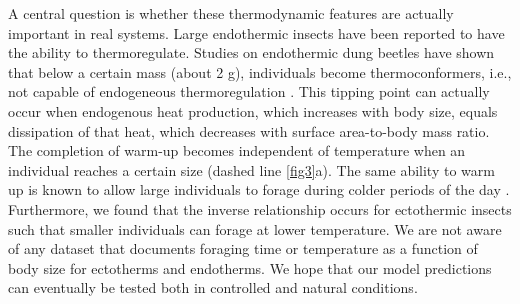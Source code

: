 A central question is whether these thermodynamic features are actually important in real systems.
Large endothermic insects have been reported to have the ability to thermoregulate.
Studies on endothermic dung beetles have shown that below a certain mass (about 2 g), individuals become thermoconformers, i.e., not capable of endogeneous thermoregulation \citep{Bartholomew1978, Verdu2006}.
This tipping point can actually occur when endogenous heat production, which increases with body size, equals dissipation of that heat, which decreases with surface area-to-body mass ratio.
The completion of warm-up becomes independent of temperature when an individual reaches a certain size (dashed line \cref{fig3}a).
The same ability to warm up is known to allow large individuals to forage during colder periods of the day \citep{May1985}.
Furthermore, we found that the inverse relationship occurs for ectothermic insects such that smaller individuals can forage at lower temperature.
We are not aware of any dataset that documents foraging time or temperature as a function of body size for ectotherms and endotherms. %
We hope that our model predictions can eventually be tested both in controlled and natural conditions.

